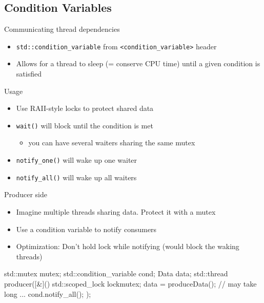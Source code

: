 \subsection[condition]{Condition Variables}

\begin{frame}[fragile]
  \begin{block}{Communicating thread dependencies}
    \begin{itemize}
      \item \texttt{std::condition_variable} from \texttt{<condition_variable>} header
      \item Allows for a thread to sleep (= conserve CPU time) until a given condition is satisfied
    \end{itemize}
  \end{block}
  \pause
  \begin{block}{Usage}
    \begin{itemize}
    \item Use RAII-style locks to protect shared data
    \item \texttt{wait()} will block until the condition is met
      \begin{itemize}
      \item you can have several waiters sharing the same mutex
      \end{itemize}
    \item \texttt{notify_one()} will wake up one waiter
    \item \texttt{notify_all()} will wake up all waiters
    \end{itemize}
  \end{block}
\end{frame}

\begin{frame}[fragile]
  \begin{block}{Producer side}
    \begin{itemize}
      \item Imagine multiple threads sharing data. Protect it with a mutex
      \item Use a condition variable to notify consumers
      \item Optimization: Don't hold lock while notifying (would block the waking threads)
    \end{itemize}
  \end{block}
  \begin{exampleblock}{}
    \begin{cppcode*}{}
      std::mutex mutex;
      std::condition_variable cond;
      Data data;
      std::thread producer([&](){
        {
          std::scoped_lock lock{mutex};
          data = produceData(); // may take long ...
        }
        cond.notify_all();
      });
    \end{cppcode*}
  \end{exampleblock}
\end{frame}

